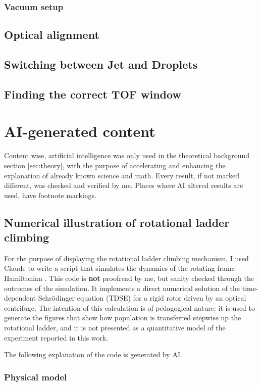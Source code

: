 \subsection{Vacuum setup}
\section{Optical alignment}
\section{Switching between Jet and Droplets}
\section{Finding the correct TOF window}


\chapter{AI-generated content}
\label{sec:ai}
Content wise, artificial intelligence was only used in the theoretical background section \ref{sec:theory}, with the purpose of accelerating and enhancing the explanation of already known science and math. Every result, if not marked different, was checked and verified by me. Places where AI altered results are used, have footnote markings. 

\section{Numerical illustration of rotational ladder climbing}
\label{sec:ai-cfg}
For the purpose of displaying the rotational ladder climbing mechanism, I used Claude to write a script that simulates the dynamics of the rotating frame Hamiltonian . This code is \textbf{not} proofread by me, but sanity checked through the outcomes of the simulation.  It implements a direct
numerical solution of the time-dependent Schr\"odinger equation (TDSE) for a rigid rotor driven by an optical centrifuge. The intention of this calculation is of pedagogical nature: it is used to generate the figures that show how population is transferred stepwise up the rotational ladder, and it is not presented as a quantitative model of the experiment reported in this work.

The following explanation of the code is generated by AI.

\subsection{Physical model}
\label{app:centrifuge-model}

